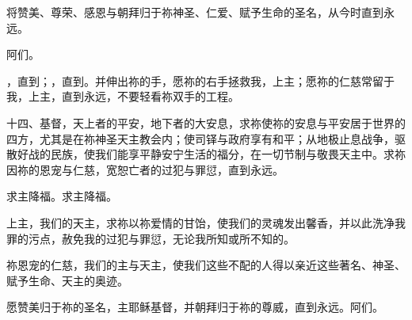 \par

将赞美、尊荣、感恩与朝拜归于祢神圣、仁爱、赋予生命的圣名，从今时直到永远。\par

\par

阿们。\par

\par

，直到；，直到。并伸出祢的手，愿祢的右手拯救我，上主；愿祢的仁慈常留于我，上主，直到永远，不要轻看祢双手的工程。\par

\par

十四、基督，天上者的平安，地下者的大安息，求祢使祢的安息与平安居于世界的四方，尤其是在祢神圣天主教会内；使司铎与政府享有和平；从地极止息战争，驱散好战的民族，使我们能享平静安宁生活的福分，在一切节制与敬畏天主中。求祢因祢的恩宠与仁慈，宽恕亡者的过犯与罪愆，直到永远。\par

\par

求主降福。求主降福。\par

\par

上主，我们的天主，求祢以祢爱情的甘饴，使我们的灵魂发出馨香，并以此洗净我罪的污点，赦免我的过犯与罪愆，无论我所知或所不知的。\par

\par

祢恩宠的仁慈，我们的主与天主，使我们这些不配的人得以亲近这些著名、神圣、赋予生命、天主的奥迹。\par

\par

愿赞美归于祢的圣名，主耶稣基督，并朝拜归于祢的尊威，直到永远。阿们。\par

